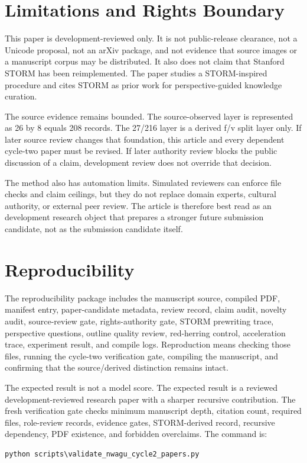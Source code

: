 \documentclass[sigconf,nonacm]{acmart}
\begin{document}
\section{Limitations and Rights Boundary}
This paper is development-reviewed only. It is not public-release clearance, not a
Unicode proposal, not an arXiv package, and not evidence that source images or a
manuscript corpus may be distributed. It also does not claim that Stanford STORM
has been reimplemented. The paper studies a STORM-inspired procedure and cites
STORM as prior work for perspective-guided knowledge curation.

The source evidence remains bounded. The source-observed layer is represented as
26 by 8 equals 208 records. The 27/216 layer is a derived f/v split layer only.
If later source review changes that foundation, this article and every
dependent cycle-two paper must be revised. If later authority review blocks the
public discussion of a claim, development review does not override that decision.

The method also has automation limits. Simulated reviewers can enforce file
checks and claim ceilings, but they do not replace domain experts, cultural
authority, or external peer review. The article is therefore best read as an
development research object that prepares a stronger future submission candidate,
not as the submission candidate itself.

\section{Reproducibility}
The reproducibility package includes the manuscript source, compiled PDF,
manifest entry, paper-candidate metadata, review record, claim audit,
novelty audit, source-review gate, rights-authority gate, STORM prewriting
trace, perspective questions, outline quality review, red-herring control,
acceleration trace, experiment result, and compile logs. Reproduction means
checking those files, running the cycle-two verification gate, compiling the manuscript,
and confirming that the source/derived distinction remains intact.

The expected result is not a model score. The expected result is a reviewed
development-reviewed research paper with a sharper recursive contribution. The fresh
verification gate checks minimum manuscript depth, citation count, required files,
role-review records, evidence gates, STORM-derived record, recursive dependency, PDF
existence, and forbidden overclaims. The command is:
\begin{verbatim}
python scripts\validate_nwagu_cycle2_papers.py
\end{verbatim}
\end{document}
